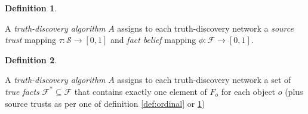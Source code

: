 \documentclass{article}
\theoremstyle{definition}
\newtheorem{definition}{Definition}
\theoremstyle{plain}
\begin{document}
\begin{definition}
\label{def:numerical}

A \emph{truth-discovery algorithm} $A$ assigns to each truth-discovery network
a \emph{source trust} mapping $\tau: \mathcal{S} \rightarrow [0, 1]$ and
\emph{fact belief} mapping $\phi: \mathcal{F} \rightarrow [0, 1]$.

\end{definition}

\begin{definition}
\label{def:most_believed}

A \emph{truth-discovery algorithm} $A$ assigns to each truth-discovery network
a set of \emph{true facts} $\mathcal{F}^* \subseteq \mathcal{F}$ that contains
exactly one element of $F_o$ for each object $o$ (plus source trusts as per one
of definition \ref{def:ordinal} or \ref{def:numerical})

\end{definition}
\end{document}
